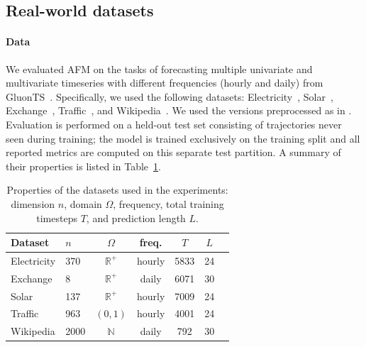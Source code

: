 \documentclass[preprint,12pt,authoryear]{elsarticle}
\newcommand{\oldrev}[1]{#1}
\begin{document}
\subsection{Real-world datasets}\label{subsec:realworld}

\paragraph{Data} We evaluated AFM on the tasks
of forecasting multiple univariate and multivariate timeseries with different frequencies (hourly and daily) from GluonTS~\citep{alexandrov2020gluonts}. Specifically, we used the following datasets: Electricity~\citep{lai2018modeling}, Solar~\citep{lai2018modeling}, Exchange~\citep{dua2017uci}, Traffic~\citep{dua2017uci}, and Wikipedia~\citep{gasthaus2019probabilistic}. 
We used the versions preprocessed as in \citet{salinas2019high}. \oldrev{Evaluation is performed on a held-out test set consisting of trajectories never seen during training; the model is trained exclusively on the training split and all reported metrics are computed on this separate test partition.} A summary of their properties is listed in Table~\ref{tab:dataset-details}.

\begin{table}
\centering
\small
\caption{Properties of the datasets used in the experiments: dimension \( n \), domain \( \Omega \), frequency, total training timesteps $T$, and prediction length $L$.}
\label{tab:dataset-details}
\begin{small}
\begin{tabular}{llccccc}
\toprule
Dataset & $n$ & $\Omega$ & freq. & $T$ & $L$\\
\midrule
Electricity  & 370 & $\mathbb{R}^+$ & hourly & 5833 & 24\\
Exchange & 8 & $\mathbb{R}^+$ & daily & 6071 & 30 \\
Solar & 137 & $\mathbb{R}^+$ & hourly & 7009 & 24 \\
Traffic & 963 & $(0,1)$ & hourly & 4001 & 24\\
Wikipedia & 2000 & $\mathbb{N}$ & daily & 792 & 30\\
\bottomrule
\end{tabular}
\end{small}
\end{table}
\end{document}
